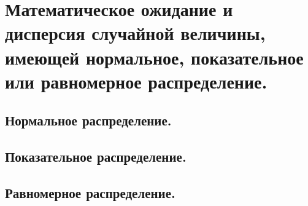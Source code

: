 \section{Математическое ожидание и дисперсия случайной величины, имеющей нормальное, показательное или равномерное распределение.}

\subsection{Нормальное распределение.}

\subsection{Показательное распределение.}

\subsection{Равномерное распределение.}